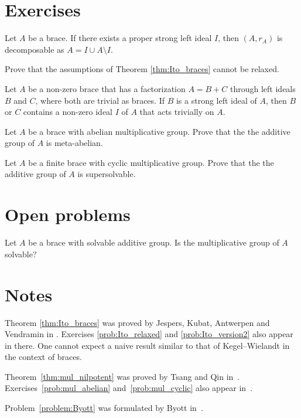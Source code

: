 \section*{Exercises}


\begin{prob}
\label{prob:decomposable}
Let $A$ be a brace. If there exists a proper strong left ideal $I$, 
then $(A,r_A)$ is decomposable as $A = I \cup A\setminus I$. 
\end{prob}

\begin{prob}
\label{prob:Ito_relaxed}
Prove that the assumptions of Theorem \ref{thm:Ito_braces} cannot be relaxed. 
\end{prob}

\begin{prob}
\label{prob:Ito_version2}
Let $A$ be a non-zero brace that has a factorization $A=B+C$ through left ideals $B$ and $C$, where both are trivial as braces. If $B$ is a strong left ideal of $A$, then $B$ or $C$ contains a non-zero ideal $I$ of $A$ that acts trivially on $A$.
\end{prob}



\begin{prob}
\label{prob:mul_abelian}
Let $A$ be a brace with abelian multiplicative group. Prove that the 
the additive group of $A$ is meta-abelian. 
\end{prob}

\begin{prob}
\label{prob:mul_cyclic}
Let $A$ be a finite brace with cyclic multiplicative group. Prove that the 
the additive group of $A$ is supersolvable. 
\end{prob}

\section*{Open problems}

\begin{problem}
\label{problem:Byott}
    Let $A$ be a brace with solvable additive group. Is the 
    multiplicative group of $A$ solvable?
\end{problem}

\section*{Notes}

Theorem \ref{thm:Ito_braces} was proved by Jespers, Kubat, Antwerpen and Vendramin in \cite{MR4023387}. 
Exercises \ref{prob:Ito_relaxed} 
and \ref{prob:Ito_version2} 
also appear in there. 
One cannot expect a naive result similar to
that of Kegel--Wielandt in the context of braces. 

Theorem~\ref{thm:mul_nilpotent} was proved by Tsang and Qin in~\cite{MR4077413}. 
Exercises~\ref{prob:mul_abelian} and~\ref{prob:mul_cyclic} also appear in~\cite{MR4077413}.

Problem~\ref{problem:Byott} was formulated by Byott in~\cite{MR3425626}.